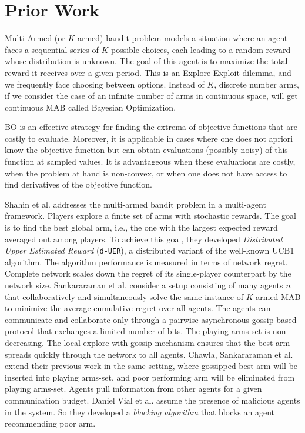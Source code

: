 \section{Prior Work}
\label{sec:prior-work}
Multi-Armed (or $K$-armed) bandit problem models a situation where an agent faces a sequential series of $K$ possible choices, each leading to a random reward whose distribution is unknown. 
The goal of this agent is to maximize the total reward it receives over a given period. 
This is an Explore-Exploit dilemma, and we frequently face choosing between options. 
Instead of $K$, discrete number arms, if we consider the case of an infinite number of arms in continuous space, will get continuous MAB called Bayesian Optimization.\cite{Srinivas-Bandits}

BO is an effective strategy for finding the extrema of objective functions that are costly to evaluate. 
Moreover, it is applicable in cases where one does not apriori know the objective function but can obtain evaluations (possibly noisy) of this function at sampled values. 
It is advantageous when these evaluations are costly, when the problem at hand is non-convex, or when one does not have access to find derivatives of the objective function.\cite{Freitas-BO}

Shahin et al.\cite{Shahrampour} addresses the multi-armed bandit problem in a multi-agent framework. 
Players explore a finite set of arms with stochastic rewards. 
The goal is to find the best global arm, i.e., the one with the largest expected reward averaged out among players. 
To achieve this goal, they developed \textit{Distributed Upper Estimated Reward} (\texttt{d-UER}), a distributed variant of the well-known UCB1 algorithm. 
The algorithm performance is measured in terms of network regret. Complete network scales down the regret of its single-player counterpart by the network size.
Sankararaman et al.\cite{Sankararaman.ma.mab} consider a setup consisting of many agents $n$ that collaboratively and simultaneously solve the same instance of $K$-armed MAB to minimize the average cumulative regret over all agents. 
The agents can communicate and collaborate only through a pairwise asynchronous gossip-based protocol that exchanges a limited number of bits. The playing arms-set is non-decreasing. 
The local-explore with gossip mechanism ensures that the best arm spreads quickly through the network to all agents.
Chawla, Sankararaman et al.\cite{chawla2020gossiping} extend their previous work in the same setting, where gossipped best arm will be inserted into playing arms-set, and poor performing arm will be eliminated from playing arms-set. 
Agents pull information from other agents for a given communication budget.
Daniel Vial et al.\cite{Daniel.robust.ma.mab} assume the presence of malicious agents in the system. So they developed a \textit{blocking algorithm} that blocks an agent recommending poor arm.

